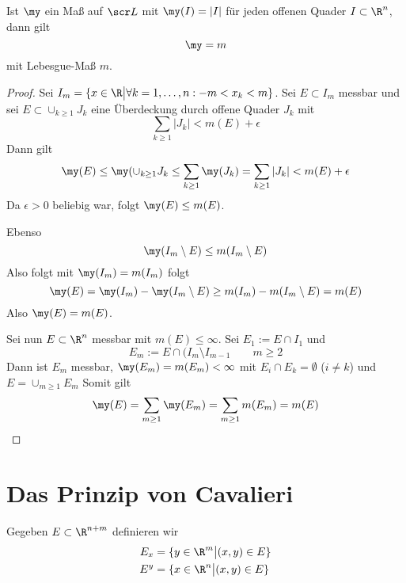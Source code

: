 \documentclass{mycourse}
\begin{document}
\begin{thm}
	\label{16.8}
	Ist $\my$ ein Maß auf $\scr L$ mit $\my(I) = |I|$ für jeden offenen Quader $I\subset \R^n$, dann gilt
	\[
		\my = m
	\]
	mit Lebesgue-Maß $m$.
	\begin{proof}
		Sei $I_m = \{x\in \R\big| \forall k=1,\dotsc,n: -m<x_k<m\}$.
		Sei $E\subset I_m$ messbar und sei $E\subset \cup_{k\ge 1}J_k$ eine Überdeckung durch offene Quader $J_k$ mit
		\[
			\sum_{k\ge 1}|J_k| < m(E) + \epsilon
		\]
		Dann gilt
		\[
			\my(E)  \le \my(\cup_{k\ge 1} J_k \le \sum_{k\ge 1}\my(J_k) = \sum_{k\ge 1}|J_k| < m(E) +\epsilon
		\]
		Da $\epsilon >0$ beliebig war, folgt $\my(E) \le m(E)$.

		Ebenso
		\[
			\my(I_m \setminus E) \le m(I_m \setminus E)
		\]
		Also folgt mit $\my(I_m) = m(I_m)$ folgt
		\[
			\my(E) = \my(I_m) - \my(I_m\setminus E) \ge m(I_m) - m(I_m\setminus E) = m(E)
		\]
		Also $\my(E) = m(E)$.

		Sei nun $E\subset \R^n$ messbar mit $m(E) \le \infty$.
		Sei $E_1 := E \cap I_1$ und
		\[
			E_m := E \cap ( I_m\setminus I_{m-1} \qquad m\ge2
		\]
		Dann ist $E_m$ messbar, $\my(E_m) = m(E_m)<\infty$ mit
		$E_i\cap E_k=\emptyset$ ($i\neq k$) und $E= \cup_{m\ge 1}E_m$
		Somit gilt
		\[
			\my(E) = \sum_{m\ge 1}\my(E_m) = \sum_{m\ge 1}m(E_m) = m(E)
		\]
	\end{proof}
\end{thm}


\section{Das Prinzip von Cavalieri}


\begin{df*}
	Gegeben $E\subset \R^{n+m}$ definieren wir
	\begin{align*}
		E_x &= \{y\in \R^m \big| (x,y) \in E\}\\
		E^y &= \{x\in \R^n \big| (x,y) \in E\}
	\end{align*}
\end{df*}
\end{document}
